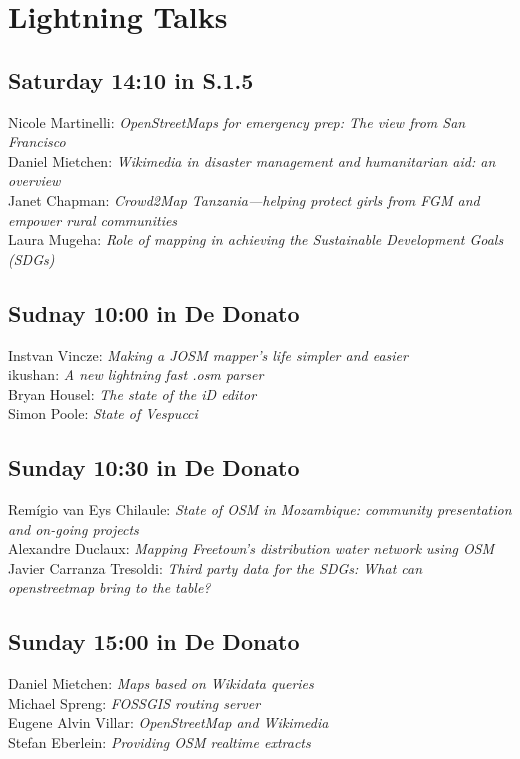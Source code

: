 \newpage
\section*{Lightning Talks}
\label{lightning-talks}
\pagestyle{cropmarksstyle}
\enlargethispage{1\baselineskip}
\subsection*{Saturday 14:10 in S.1.5}
Nicole Martinelli: \emph{OpenStreetMaps for emergency prep: The view from San Francisco}\\
Daniel Mietchen: \emph{Wikimedia in disaster management and humanitarian aid: an overview}\\
Janet Chapman: \emph{Crowd2Map Tanzania---helping protect girls from FGM and empower rural communities}\\
Laura Mugeha: \emph{Role of mapping in achieving the Sustainable Development Goals (SDGs)}

\subsection*{Sudnay 10:00 in De Donato}
Instvan Vincze: \emph{Making a JOSM mapper's life simpler and easier}\\
ikushan: \emph{A new lightning fast .osm parser}\\
Bryan Housel: \emph{The state of the iD editor}\\
Simon Poole: \emph{State of Vespucci}

\subsection*{Sunday 10:30 in De Donato}
Remígio van Eys Chilaule: \emph{State of OSM in Mozambique: community presentation and on-going projects}\\
Alexandre Duclaux: \emph{Mapping Freetown’s distribution water network using OSM}\\
Javier Carranza Tresoldi: \emph{Third party data for the SDGs: What can openstreetmap bring to the table?}\\

\subsection*{Sunday 15:00 in De Donato}
Daniel Mietchen: \emph{Maps based on Wikidata queries}\\
Michael Spreng: \emph{FOSSGIS routing server}\\
Eugene Alvin Villar: \emph{OpenStreetMap and Wikimedia}\\
Stefan Eberlein: \emph{Providing OSM realtime extracts}

